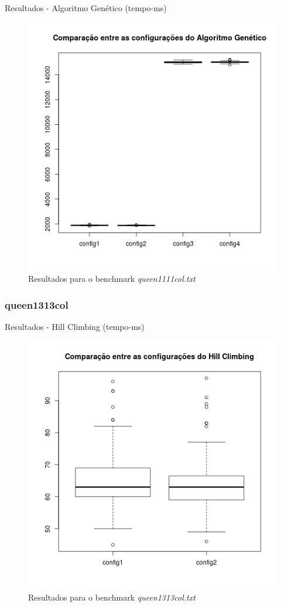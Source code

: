 \documentclass[compress, hide notes]{beamer}
\begin{document}
        \begin{frame}{Resultados - Algoritmo Genético (tempo-ms)}
        
        	\begin{figure}[H]
			\centering
            \label{fig:tmp-ga-queen1111col}
            \includegraphics[width=0.6\linewidth]{img/ga-tmp-queen1111col.png}
            \caption[Resultados para o benchmark queen1111col.txt]{Resultados para o benchmark \textit{queen1111col.txt}}
			\end{figure}

		\end{frame}
        
        \subsubsection{queen1313col}
		
        \begin{frame}{Resultados - Hill Climbing (tempo-ms)}
        
        	\begin{figure}[H]
			\centering
            \label{fig:tmp-hc-queen1313col}
            \includegraphics[width=0.6\linewidth]{img/hill-tmp-queen1313col.png}
            \caption[Resultados para o benchmark queen1313col.txt]{Resultados para o benchmark \textit{queen1313col.txt}}
			\end{figure}

		\end{frame}
        
\end{document}
